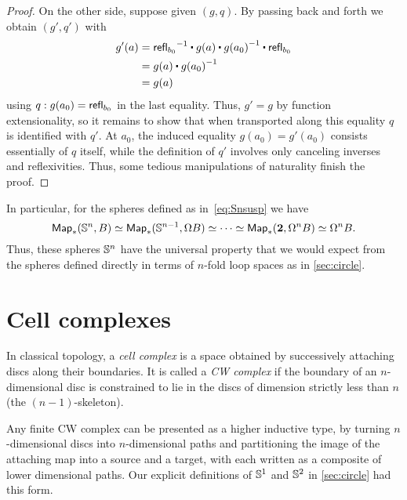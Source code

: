 \begin{proof}
  On the other side, suppose given $(g,q)$.
  By passing back and forth we obtain $(g',q')$ with
  \begin{align*}
    g'(a) &= \opp{\refl{b_0}} \ct g(a) \ct \opp{g(a_0)} \ct \refl{b_0}\\
    &= g(a) \ct \opp{g(a_0)}\\
    &= g(a)
  \end{align*}
  using $q:g(a_0) = \mathsf{refl}_{b_0}$ in the last equality.
  Thus, $g'=g$ by function extensionality, so it remains to show that when transported along this equality $q$ is identified with $q'$.
  At $a_0$, the induced equality $g(a_0)=g'(a_0)$ consists essentially of $q$ itself, while the definition of $q'$ involves only canceling inverses and reflexivities.
  Thus, some tedious manipulations of naturality finish the proof.
\end{proof}

%
In particular, for the spheres defined as in~\eqref{eq:Snsusp} we have
\[ \mathsf{Map}_*(\mathbb{S}^n,B) \simeq \mathsf{Map}_*(\mathbb{S}^{n-1}, \Omega B) \simeq \cdots \simeq \mathsf{Map}_*(\mathbf{2},\Omega^n B) \simeq \Omega^n B. \]
Thus, these spheres $\mathbb{S}^n$ have the universal property that we would expect from the spheres defined directly in terms of $n$-fold loop spaces as in \autoref{sec:circle}.

%

\section{Cell complexes}
\label{sec:cell-complexes}

%
%
In classical topology, a \emph{cell complex} is a space obtained by successively attaching discs along their boundaries.
It is called a \emph{CW complex} if the boundary of an $n$-dimensional disc is constrained to lie in the discs of dimension strictly less than $n$ (the $(n-1)$-skeleton).

Any finite CW complex can be presented as a higher inductive type, by turning $n$-dimensional discs into $n$-dimensional paths and partitioning the image of the attaching map into a source and a target, with each written as a composite of lower dimensional paths.
Our explicit definitions of $\mathbb{S}^1$ and $\mathbb{S}^2$ in \autoref{sec:circle} had this form.

